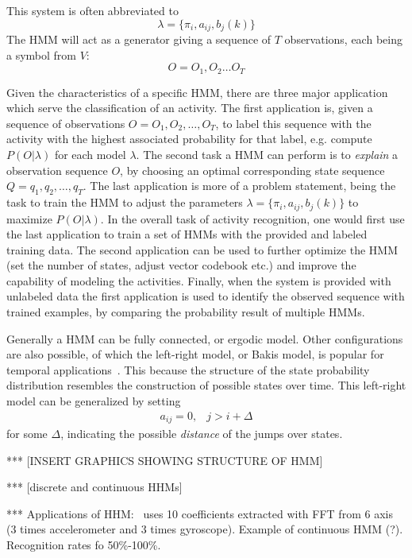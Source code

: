 This system is often abbreviated to
\begin{equation}
	\lambda = \{ \pi_i, a_{ij}, b_j(k)\}
\end{equation}
The HMM will act as a generator giving a sequence of $T$ observations, each being a symbol from $V$:
\begin{equation}
	O = O_1, O_2 \dots O_T
\end{equation}

Given the characteristics of a specific HMM, there are three major application which serve the classification of an activity.
The first application is, given a sequence of observations $O = O_1,O_2,\dots,O_T$, to label this sequence with the activity with the highest associated probability for that label, e.g. compute $P(O|\lambda)$ for each model $\lambda$.
The second task a HMM can perform is to \emph{explain} a observation sequence $O$, by choosing an optimal corresponding state sequence $Q = q_1,q_2,\dots,q_T$.
The last application is more of a problem statement, being the task to train the HMM to adjust the parameters $\lambda = \{ \pi_i, a_{ij}, b_j(k)\}$ to maximize $P(O|\lambda)$.
In the overall task of activity recognition, one would first use the last application to train a set of HMMs with the provided and labeled training data.
The second application can be used to further optimize the HMM (set the number of states, adjust vector codebook etc.) and improve the capability of modeling the activities.
Finally, when the system is provided with unlabeled data the first application is used to identify the observed sequence with trained examples, by comparing the probability result of multiple HMMs.

Generally a HMM can be fully connected, or ergodic model.
Other configurations are also possible, of which the left-right model, or Bakis model, is popular for temporal applications~\cite{rabiner1989tutorial}.
This because the structure of the state probability distribution resembles the construction of possible states over time.
This left-right model can be generalized by setting
\begin{eqnarray}
	a_{ij} = 0, & j > i + \Delta
\end{eqnarray}
for some $\Delta$, indicating the possible \emph{distance} of the jumps over states.

*** [INSERT GRAPHICS SHOWING STRUCTURE OF HMM]

*** [discrete and continuous HHMs]

*** Applications of HHM:~\cite{shi2009towards} uses 10 coefficients extracted with FFT from 6 axis (3 times accelerometer and 3 times gyroscope).
Example of continuous HMM (?).
Recognition rates fo 50\%-100\%.

